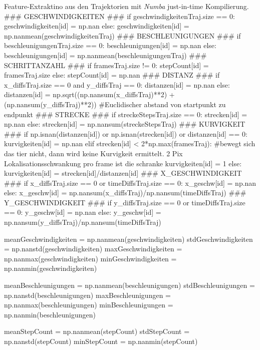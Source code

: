 \begin{pythoncodeAnhang}{Feature-Extraktino aus den Trajektorien mit \textit{Numba} just-in-time Kompilierung.}
        ### GESCHWINDIGKEITEN ###
        if geschwindigkeitenTraj.size == 0:
            geschwindigkeiten[id] = np.nan  
        else:  
            geschwindigkeiten[id] = np.nanmean(geschwindigkeitenTraj)
        ### BESCHLEUNIGUNGEN ###
        if beschleunigungenTraj.size == 0:
            beschleunigungen[id] = np.nan    
        else:
            beschleunigungen[id] = np.nanmean(beschleunigungenTraj)
        ### SCHRITTANZAHL ###
        if framesTraj.size != 0:
            stepCount[id] = framesTraj.size 
        else:
            stepCount[id] = np.nan
        ### DISTANZ ###
        if x_diffsTraj.size == 0 and y_diffsTraj == 0:
            distanzen[id] = np.nan    
        else:
            distanzen[id] = np.sqrt((np.nansum(x_diffsTraj)**2) + (np.nansum(y_diffsTraj)**2))    #Euclidischer abstand von startpunkt zu endpunkt
        ### STRECKE ###
        if streckeStepsTraj.size == 0:
            strecken[id] = np.nan
        else:    
            strecken[id] = np.nansum(streckeStepsTraj)
        ### KURVIGKEIT ###
        if np.isnan(distanzen[id]) or np.isnan(strecken[id]) or distanzen[id] == 0:
            kurvigkeiten[id] = np.nan
        elif strecken[id] < 2*np.max(framesTraj):       #bewegt sich das tier nicht, dann wird keine Kurvigkeit ermittelt. 2 Pix Lokalisationsschwankung pro frame ist die schranke
            kurvigkeiten[id] = 1
        else:
            kurvigkeiten[id] = strecken[id]/distanzen[id]
        ### X_GESCHWINDIGKEIT ###
        if x_diffsTraj.size == 0 or timeDiffsTraj.size == 0:
            x_geschw[id] = np.nan
        else:
            x_geschw[id] = np.nansum(x_diffsTraj)/np.nansum(timeDiffsTraj)
        ### Y_GESCHWINDIGKEIT ###
        if y_diffsTraj.size == 0 or timeDiffsTraj.size == 0:
            y_geschw[id] = np.nan
        else:
            y_geschw[id] = np.nansum(y_diffsTraj)/np.nansum(timeDiffsTraj)

    meanGeschwindigkeiten = np.nanmean(geschwindigkeiten)
    stdGeschwindigkeiten = np.nanstd(geschwindigkeiten)
    maxGeschwindigkeiten = np.nanmax(geschwindigkeiten)
    minGeschwindigkeiten = np.nanmin(geschwindigkeiten)

    meanBeschleunigungen = np.nanmean(beschleunigungen)
    stdBeschleunigungen = np.nanstd(beschleunigungen)
    maxBeschleunigungen = np.nanmax(beschleunigungen)
    minBeschleunigungen = np.nanmin(beschleunigungen)

    meanStepCount = np.nanmean(stepCount)
    stdStepCount = np.nanstd(stepCount)
    minStepCount = np.nanmin(stepCount)


\end{pythoncodeAnhang}
